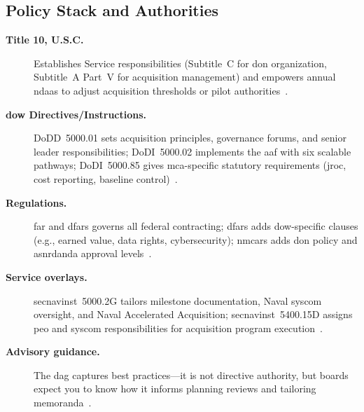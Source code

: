 \documentclass[../main.tex]{subfiles}
\begin{document}
\subsection{Policy Stack and Authorities}
\begin{description}
  \item[\textbf{Title 10, U.S.C.}] Establishes Service responsibilities (Subtitle~C for \ac{don} organization, Subtitle~A Part~V for acquisition management) and empowers annual \acp{ndaa} to adjust acquisition thresholds or pilot authorities~\autocite{edo-3-3-1-acq-policy-players-2025}.
  \item[\textbf{\ac{dow} Directives/Instructions.}] DoDD~5000.01 sets acquisition principles, governance forums, and senior leader responsibilities; DoDI~5000.02 implements the \ac{aaf} with six scalable pathways; DoDI~5000.85 gives \ac{mca}-specific statutory requirements (\ac{jroc}, cost reporting, baseline control)~\autocite{DoDD5000-01,DoDI5000-02,DoDI5000-85}.
  \item[\textbf{Regulations.}] \ac{far} and \ac{dfars} governs all federal contracting; \ac{dfars} adds \ac{dow}-specific clauses (e.g., earned value, data rights, cybersecurity); \ac{nmcars} adds \ac{don} policy and \ac{asnrdanda} approval levels~\autocite{FAR,DFARS,NMCARS}.
  \item[\textbf{Service overlays.}] \ac{secnavinst}~5000.2G tailors milestone documentation, Naval \ac{syscom} oversight, and Naval Accelerated Acquisition; \ac{secnavinst}~5400.15D assigns \ac{peo} and \ac{syscom} responsibilities for acquisition program execution~\autocite{SECNAV5000-2G,SECNAV5400-15D}.
  \item[\textbf{Advisory guidance.}] The \ac{dag} captures best practices---it is not directive authority, but boards expect you to know how it informs planning reviews and tailoring memoranda~\autocite{DoDAcqGuidebook}.
\end{description}
\end{document}
